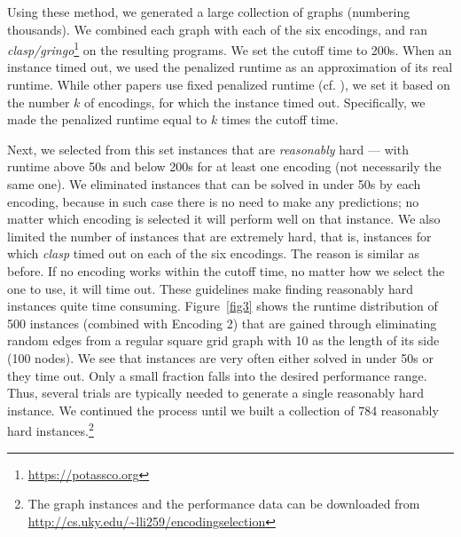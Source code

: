 \documentclass{new_tlp}
\begin{document}
Using these method, we generated a large collection of graphs (numbering
thousands). We combined each graph with each of the six encodings, and ran 
\emph{clasp/gringo}\footnote{\url{https://potassco.org}} on the resulting 
programs. We set the cutoff time to 200s. 
When an instance timed out, we used the penalized runtime as an approximation 
of its real runtime. While other papers use fixed penalized runtime (cf.
\cite{HoosLS14}), we set it based on the number $k$ of encodings,
for which the instance timed out. Specifically, we made the penalized runtime 
equal to $k$ times the cutoff time.

Next, we selected from this set instances that are \emph{reasonably} hard --- 
with runtime above 50s and below 200s for at least one encoding (not 
necessarily the same one). We eliminated instances that can be solved in 
under 50s by each encoding, because in such case there is no need to make 
any predictions; no matter which encoding is selected it will perform well 
on that instance. We also limited the number of instances that are extremely 
hard, that is, instances for which \emph{clasp} timed out on each of the 
six encodings. The reason is similar as before. If no encoding works within 
the cutoff time, no matter how we select the one to use, it will time out. 
These guidelines make finding reasonably hard instances quite time consuming. 
Figure~\ref{fig3} shows the runtime distribution of 500 instances (combined 
with Encoding 2) that are gained through eliminating random edges from a 
regular square grid graph with 10 as the length of its side (100 nodes). 
We see that instances are very often either solved in under 50s or they time 
out. Only a small fraction falls into the desired performance range. Thus,
several trials are typically needed to generate a single reasonably hard 
instance. We continued the process until we built a collection of 784 
reasonably hard instances.\footnote{The graph instances and the performance data
can be downloaded from \url{http://cs.uky.edu/~lli259/encodingselection}}
\end{document}
